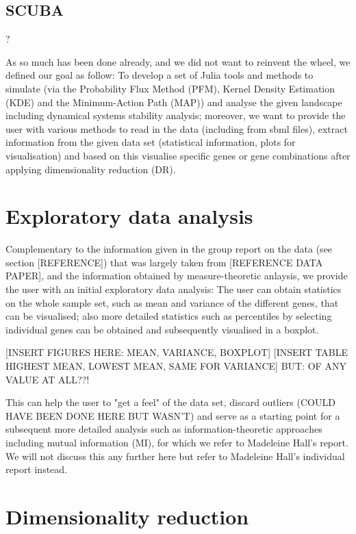 \documentclass[journal, a4paper]{IEEEtran}
\begin{document}
\subsection{SCUBA}?

As so much has been done already, and we did not want to reinvent the wheel, we defined our goal as follow: To develop a set of Julia tools and methods to simulate (via the Probability Flux Method (PFM), Kernel Density Estimation (KDE) and the Minimum-Action Path (MAP)) and analyse the given landscape including dynamical systems stability analysis; moreover, we want to provide the user with various methods to read in the data (including from sbml files), extract information from the given data set (statistical information, plots for visualisation) and based on this visualise specific genes or gene combinations after applying dimensionality reduction (DR). 


\section{Exploratory data analysis}

Complementary to the information given in the group report on the data (see section [REFERENCE]) that was largely taken from [REFERENCE DATA PAPER], and the information obtained by measure-theoretic anlaysis, we provide the user with an initial exploratory data analysis:
The user can obtain statistics on the whole sample set, such as mean and variance of the different genes, that can be visualised; also more detailed statistics such as percentiles by selecting individual genes can be obtained and subsequently visualised in a boxplot.

[INSERT FIGURES HERE: MEAN, VARIANCE, BOXPLOT] 
[INSERT TABLE HIGHEST MEAN, LOWEST MEAN, SAME FOR VARIANCE]
BUT: OF ANY VALUE AT ALL??!

This can help the user to "get a feel" of the data set, discard outliers (COULD HAVE BEEN DONE HERE BUT WASN'T) and serve as a starting point for a subsequent more detailed analysis such as information-theoretic approaches including mutual information (MI), for which we refer to Madeleine Hall's report. We will not discuss this any further here but refer to Madeleine Hall's individual report instead.


\section{Dimensionality reduction}
\end{document}

